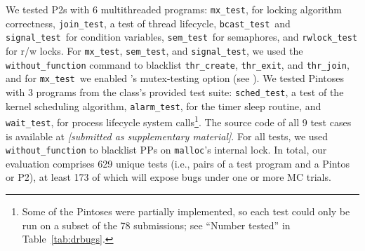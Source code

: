 \newcommand\mxtest{\texttt{mx\_test}}
\newcommand\tej{\texttt{join\_test}}
\newcommand\bct{\texttt{bcast\_test}}
\newcommand\paraguay{\texttt{signal\_test}}
\newcommand\paradise{\texttt{sem\_test}}
\newcommand\rwldgr{\texttt{rwlock\_test}}
\newcommand\prisema{\texttt{sched\_test}}
\newcommand\waitsimple{\texttt{wait\_test}}
\newcommand\alarmsimul{\texttt{alarm\_test}}

We tested P2s with 6 multithreaded programs:
\mxtest, for locking algorithm correctness,
\tej, a test of thread lifecycle,
\bct~and \paraguay~for condition variables,
\paradise~for semaphores,
and \rwldgr\\for r/w locks.
For \mxtest, \paradise, and \paraguay, we used the {\tt without\_function} command to blacklist {\tt thr\_create}, {\tt thr\_exit}, and {\tt thr\_join},
and for \mxtest~we enabled \landslide's mutex-testing option
(see \sect{\ref{sec:landslide}}).
We tested Pintoses with 3 programs from the class's provided test suite: \prisema, a test of the kernel scheduling algorithm,
\alarmsimul, for the timer sleep routine,
and \waitsimple, for process lifecycle system calls\footnote{
	Some of the Pintoses were partially implemented,
	so each test could only be run on a subset of the 78 submissions; see ``Number tested'' in Table~\ref{tab:drbugs}.
}.
The source code of all 9 test cases is available at
{\em [submitted as supplementary material]}.
For all tests, we used {\tt without\_function} to blacklist PPs on {\tt malloc}'s internal lock.
In total, our evaluation comprises 629 unique tests (i.e., pairs of a test program and a Pintos or P2),
at least 173 of which will expose bugs under one or more MC trials. %

